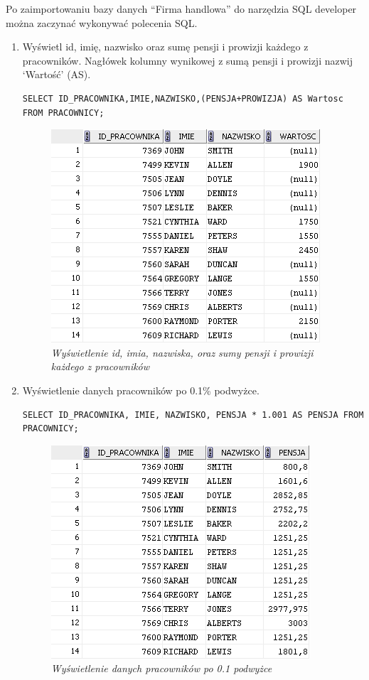 \documentclass[a4paper, 10pt]{article}
\begin{document}
Po zaimportowaniu bazy danych ``Firma handlowa'' do narzędzia SQL developer można zaczynać  wykonywać polecenia SQL.

\begin{enumerate}

\item Wyświetl id, imię, nazwisko oraz sumę pensji i prowizji każdego z pracowników. Nagłówek kolumny wynikowej z sumą pensji i prowizji nazwij `Wartość' (AS). 

\begin{lstlisting}[style=SQL, caption=\textit{Wyświetlenie id, imia, nazwiska oraz sumy pensji i prowizji każdego z pracowników}]
SELECT ID_PRACOWNIKA,IMIE,NAZWISKO,(PENSJA+PROWIZJA) AS Wartosc FROM PRACOWNICY;
\end{lstlisting}

\begin{figure}[H]
	\centering
	\includegraphics[scale=0.7]{zadanie1.png}
	\caption{\textit{Wyświetlenie id, imia, nazwiska, oraz sumy pensji i prowizji każdego z pracowników}}
\end{figure}

\item Wyświetlenie danych pracowników po 0.1\% podwyżce.
\begin{lstlisting}[style=SQL, caption=\textit{Wyświetlenie danych pracowników po 0.1 podwyżce}]
SELECT ID_PRACOWNIKA, IMIE, NAZWISKO, PENSJA * 1.001 AS PENSJA FROM PRACOWNICY;
\end{lstlisting}

\begin{figure}[H]
	\centering
	\includegraphics[scale=0.7]{zadanie2.png}
	\caption{\textit{Wyświetlenie danych pracowników po 0.1 podwyżce}}
\end{figure}



\end{enumerate}
\end{document}
